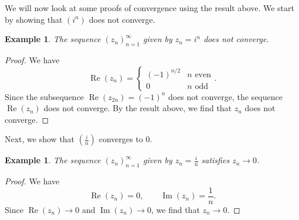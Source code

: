 \documentclass[a4paper, openany]{memoir}
\theoremstyle{definition}
\theoremstyle{plain}
\newtheorem{example}[definition]{Example}
\begin{document}
\noindent We will now look at some proofs of convergence using the result above. We start by showing that $(i^n)$ does not converge.
\begin{example}
The sequence $(z_n)_{n=1}^{\infty}$ given by $z_n = i^n$ does not converge.
\end{example}
\begin{proof}
We have
\[\operatorname{Re}(z_n) = \begin{cases}
(-1)^{n/2} & n \text{ even} \\
0 & n \text{ odd}
\end{cases}.\]
Since the subsequence $\operatorname{Re}(z_{2n}) = (-1)^n$ does not converge, the sequence $\operatorname{Re}(z_n)$ does not converge. By the result above, we find that $z_n$ does not converge.
\end{proof}
\noindent Next, we show that $(\frac{i}{n})$ converges to 0.
\begin{example}
The sequence $(z_n)_{n=1}^{\infty}$ given by $z_n = \frac{i}{n}$ satisfies $z_n \to 0$.
\end{example}
\begin{proof}
We have
\[\operatorname{Re}(z_n) = 0, \qquad \operatorname{Im}(z_n) = \frac{1}{n}.\]
Since $\operatorname{Re}(z_n) \to 0$ and $\operatorname{Im}(z_n) \to 0$, we find that $z_n \to 0$.
\end{proof}
\end{document}
